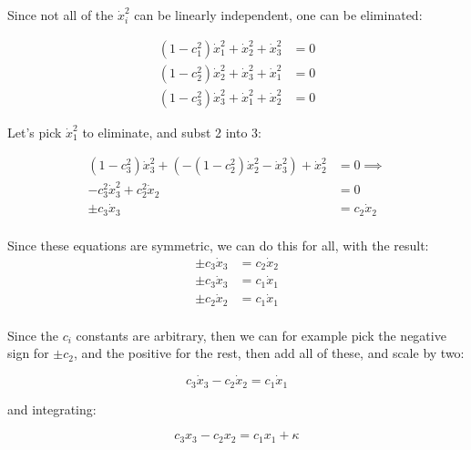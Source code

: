 \documentclass{article}      %
\newcommand{\xdot}[0]{\dot{x}}
\begin{document}
Since not all of the $\xdot_i^2$ can be linearly independent, one can be eliminated:

\begin{align*}
(1 - c_1^2) \xdot_1^2 + \xdot_2^2 + \xdot_3^2 &= 0 \\
(1 - c_2^2) \xdot_2^2 + \xdot_3^2 + \xdot_1^2 &= 0 \\
(1 - c_3^2) \xdot_3^2 + \xdot_1^2 + \xdot_2^2 &= 0
\end{align*}

Let's pick $\xdot_1^2$ to eliminate, and subst 2 into 3:

\begin{align*}
(1 - c_3^2) \xdot_3^2 + (-(1 - c_2^2) \xdot_2^2 - \xdot_3^2) + \xdot_2^2 &= 0
\implies \\
- c_3^2 \xdot_3^2 + c_2^2 \xdot_2 &= 0 \\
\pm c_3 \xdot_3 &= c_2 \xdot_2 \\
\end{align*}

%

Since these equations are symmetric, we can do this for all, with the result:
\begin{align*}
\pm c_3 \xdot_3 &= c_2 \xdot_2 \\
\pm c_3 \xdot_3 &= c_1 \xdot_1 \\
\pm c_2 \xdot_2 &= c_1 \xdot_1 \\
\end{align*}

Since the $c_i$ constants are arbitrary, then we can for example pick the negative sign for $\pm c_2$, and the positive for the rest, then add all of these, and scale by two:

\begin{equation*}
c_3 \xdot_3 - c_2 \xdot_2 = c_1 \xdot_1
\end{equation*}

and integrating:

\begin{equation*}
c_3 x_3 - c_2 x_2 = c_1 x_1 + \kappa
\end{equation*}
\end{document}
